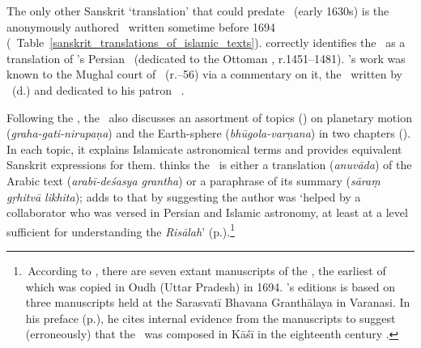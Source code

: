 The only other Sanskrit `translation' that could predate \Siddhantasindhu\ (early 1630s) is the anonymously authored \Hayatagrantha\ written sometime before 1694 (\vid\ Table~\ref{sanskrit_translations_of_islamic_texts}). \textcite[327]{PingreeIslamAstSkt} correctly identifies the \Hayatagrantha\ as a translation of \aliQushji's Persian \Risaladarilmalhaya\ (dedicated to the Ottoman \MehmetII, r.\@ 1451--1481). \aliQushji's work was known to the Mughal court of \Humayun\ (r.--56) via a commentary on it, the \SharhilmalHaya\ written by \MuslihalDinMuhammadLari\ (d.) and dedicated to his patron \Humayun\ \parencite[296]{Pourjavady}. 

Following the \SharhilmalHaya, the \Hayatagrantha\ also discusses an assortment of topics (\prakarana) on planetary motion (\textit{graha-gati-nirupaṇa}) and the Earth-sphere (\textit{bhūgola-varṇana}) in two chapters (\adhyaya). In each topic, it explains Islamicate astronomical terms and provides equivalent Sanskrit expressions for them. \textcite[p. of the preface]{BhattacaryaHayata} thinks the \Hayatagrantha\ is either a translation (\textit{anuvāda}) of the Arabic text (\textit{arabī-deśasya grantha}) or a paraphrase of its summary (\textit{sāraṃ gṛhitvā likhita}); \textcite{PingreeIndianReception} adds to that by suggesting the author was `helped by a collaborator who was versed in Persian and Islamic astronomy, at least at a level sufficient for understanding the \textit{Risālah}' (p.).\footnote{\,According to \textcite[p.\thinspace 57ab in Volume A4]{PingreeCESS}, there are seven extant manuscripts of the \Hayatagrantha, the earliest of which was copied in Oudh (Uttar Pradesh) in 1694. \citeauthor{BhattacaryaHayata}'s editions is based on three manuscripts held at the Sarasvatī Bhavana Granthālaya in Varanasi. In his preface (p.), he cites internal evidence from the manuscripts to suggest (erroneously) that the \Hayatagrantha\ was composed in Kāśī in the eighteenth century \parencite[\vid][326--327]{PingreeIslamAstSkt}.} 

